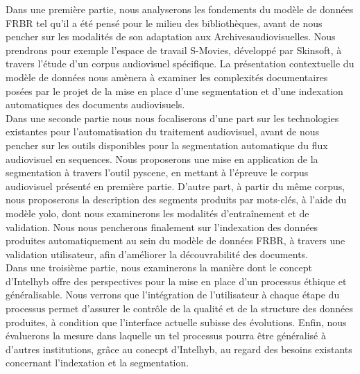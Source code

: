 Dans une première partie, nous analyserons les fondements du modèle de données FRBR tel qu'il a été pensé pour le milieu des bibliothèques, avant de nous pencher sur les modalités de son adaptation aux \gls{Archivesaudiovisuelles}. Nous prendrons pour exemple l'espace de travail S-Movies, développé par Skinsoft, à travers l'étude d'un corpus audiovisuel spécifique. La présentation contextuelle du modèle de données nous amènera à examiner les complexités documentaires posées par le projet de la mise en place d'une segmentation et d'une indexation automatiques des documents audiovisuels. \\
Dans une seconde partie nous nous focaliserons d'une part sur les technologies existantes pour l'automatisation du traitement audiovisuel, avant de nous pencher sur les outils disponibles pour la segmentation automatique du flux audiovisuel en \gls{sequence}s. Nous proposerons une mise en application de la segmentation à travers l'outil \gls{pyscene}, en mettant à l'épreuve le corpus audiovisuel présenté en première partie. D'autre part, à partir du même corpus, nous proposerons la description des segments produits par mots-clés, à l'aide du modèle \gls{yolo}, dont nous examinerons les modalités d'entraînement et de validation. Nous nous pencherons finalement sur l'indexation des données produites automatiquement au sein du modèle de données \gls{FRBR}, à travers une validation utilisateur, afin d'améliorer la découvrabilité des documents.  \\
Dans une troisième partie, nous examinerons la manière dont le concept d'\gls{Intelhyb} offre des perspectives pour la mise en place d'un processus éthique et généralisable. Nous verrons que l'intégration de l'utilisateur à chaque étape du processus permet d'assurer le contrôle de la qualité et de la structure des données produites, à condition que l'interface actuelle subisse des évolutions. Enfin, nous évaluerons la mesure dans laquelle un tel processus pourra être généralisé à d'autres institutions, grâce au conecpt d'\gls{Intelhyb}, au regard des besoins existants concernant l'indexation et la segmentation.  

